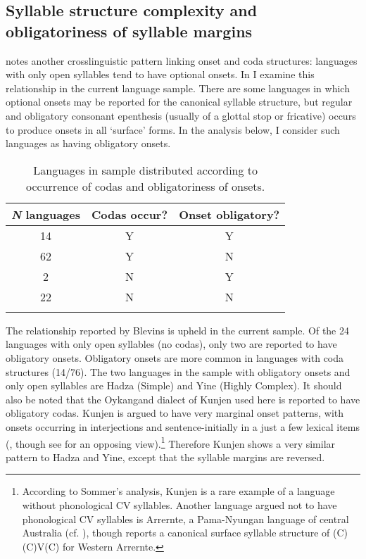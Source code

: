 \subsection{Syllable structure complexity and obligatoriness of syllable margins}\label{sec:3.3.3}

  \citet[336]{Blevins2006} notes another crosslinguistic pattern linking onset and coda structures: languages with only open syllables tend to have optional onsets. In  I examine this relationship in the current language sample. There are some languages in which optional onsets may be reported for the canonical syllable structure, but regular and obligatory consonant epenthesis (usually of a glottal stop or fricative) occurs to produce onsets in all ‘surface’ forms. In the analysis below, I consider such languages as having obligatory onsets.

\begin{table}
\begin{tabular}{ccc}
\lsptoprule
 \textit{N} languages & Codas occur? & Onset obligatory?\\\midrule
 14 & Y & Y\\
 62 & Y & N\\
 \phantom{1}2 & N & Y\\
 22 & N & N\\
\lspbottomrule
\end{tabular}
\caption{\label{tab:3.3}Languages in sample distributed according to occurrence of codas and obligatoriness of onsets.}
\end{table}

  The relationship reported by Blevins is upheld in the current sample. Of the 24 languages with only open syllables (no codas), only two are reported to have obligatory onsets. Obligatory onsets are more common in languages with coda structures (14/76). The two languages in the sample with obligatory onsets and only open syllables are Hadza (Simple) and Yine (Highly Complex). It should also be noted that the Oykangand dialect of Kunjen used here is reported to have obligatory codas. Kunjen is argued to have very marginal onset patterns, with onsets occurring in interjections and sentence-initially in a just a few lexical items (\citealt{Sommer1969,Sommer1970,Sommer1981}, though see \citealt{Dixon1970} for an opposing view).\footnote{{According to Sommer’s analysis, Kunjen is a rare example of a language without phonological CV syllables. Another language argued not to have phonological CV syllables is Arrernte, a Pama-Nyungan language of central Australia (cf. \citealt{BreenPensalfini1999}), though \citet{Anderson2000} reports a canonical surface syllable structure of (C)(C)V(C) for Western Arrernte.}} Therefore Kunjen shows a very similar pattern to Hadza and Yine, except that the syllable margins are reversed.

